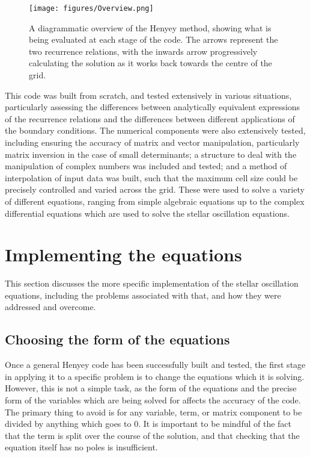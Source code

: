 \documentclass[11pt]{amsart}
\begin{document}
\begin{figure}
\begin{center}
\texttt{[image: figures/Overview.png]}
\caption{A diagrammatic overview of the Henyey method, showing what is being evaluated at each stage of the code.  The arrows represent the two recurrence relations, with the inwards arrow progressively calculating the solution as it works back towards the centre of the grid.}
\label{fig:overview}
\end{center}
\end{figure}


This code was built from scratch, and tested extensively in various situations, particularly assessing the differences between analytically equivalent expressions of the recurrence relations and the differences between different applications of the boundary conditions.  The numerical components were also extensively tested, including ensuring the accuracy of matrix and vector manipulation, particularly matrix inversion in the case of small determinants; a structure to deal with the manipulation of complex numbers was included and tested; and a method of interpolation of input data was built, such that the maximum cell size could be precisely controlled and varied across the grid.  These were used to solve a variety of different equations, ranging from simple algebraic equations up to the complex differential equations which are used to solve the stellar oscillation equations.







\section{Implementing the equations}  \label{Implement}

This section discusses the more specific implementation of the stellar oscillation equations, including the problems associated with that, and how they were addressed and overcome.

\subsection{Choosing the form of the equations}  \label{Implement:Form}

Once a general Henyey code has been successfully built and tested, the first stage in applying it to a specific problem is to change the equations which it is solving.  However, this is not a simple task, as the form of the equations and the precise form of the variables which are being solved for affects the accuracy of the code.  The primary thing to avoid is for any variable, term, or matrix component to be divided by anything which goes to $0$.  It is important to be mindful of the fact that the term is split over the course of the solution, and that checking that the equation itself has no poles is insufficient.
\end{document}
